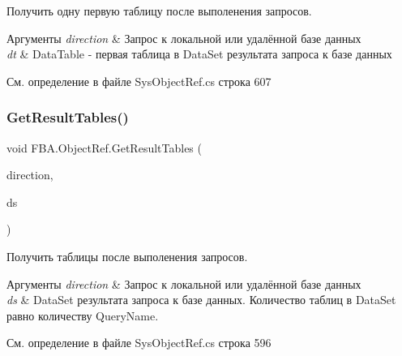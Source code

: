 Получить одну первую таблицу после выполенения запросов. 


\begin{DoxyParams}{Аргументы}
{\em direction} & Запрос к локальной или удалённой базе данных\\
\hline
{\em dt} & Data\+Table -\/ первая таблица в Data\+Set результата запроса к базе данных\\
\hline
\end{DoxyParams}


См. определение в файле Sys\+Object\+Ref.\+cs строка 607

\mbox{\label{class_f_b_a_1_1_object_ref_adabc73cda24d045c84b8296012a3c13c}} 
\subsubsection{\texorpdfstring{Get\+Result\+Tables()}{GetResultTables()}}
{\footnotesize\ttfamily void F\+B\+A.\+Object\+Ref.\+Get\+Result\+Tables (\begin{DoxyParamCaption}\item[{\mbox{\hyperlink{namespace_f_b_a_a6ff7d5c242d98046d1980715b06d7300}{Direction\+Query}}}]{direction,  }\item[{out System.\+Data.\+Data\+Set}]{ds }\end{DoxyParamCaption})}



Получить таблицы после выполенения запросов. 


\begin{DoxyParams}{Аргументы}
{\em direction} & Запрос к локальной или удалённой базе данных\\
\hline
{\em ds} & Data\+Set результата запроса к базе данных. Количество таблиц в Data\+Set равно количеству Query\+Name.\\
\hline
\end{DoxyParams}


См. определение в файле Sys\+Object\+Ref.\+cs строка 596

\mbox{\label{class_f_b_a_1_1_object_ref_a6287de4b88ed43911676ca8e585fc925}} 
